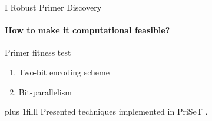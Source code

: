 \documentclass[xcolor=dvipsnames,envcountsect]{beamer}
\newcommand{\flushdown}{\vskip0pt plus 1filll}
\begin{document}
\begin{frame}{I Robust Primer Discovery}
\framesubtitle{How to make it computational feasible?}
Primer fitness test
\begin{enumerate}
    \item Two-bit encoding scheme %
    \item<2> Bit-parallelism %
\end{enumerate}
\flushdown
Presented techniques implemented in PriSeT \cite{PriSeTGitHub}.
\end{frame}
\end{document}
